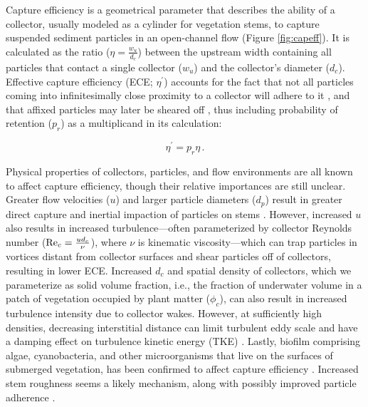 \documentclass[geosciences,article,submit,moreauthors,pdftex]{Definitions/mdpi}
\begin{document}
Capture efficiency is a geometrical parameter that describes the ability of a collector, usually modeled as a cylinder for vegetation stems, to capture suspended sediment particles in an open-channel flow (Figure \ref{fig:capeff}). It is calculated as the ratio ($\eta=\frac{w_u}{d_c}$) between the upstream width containing all particles that contact a single collector ($w_u$) and the collector's diameter ($d_c$). Effective capture efficiency (ECE; $\eta^\prime$) accounts for the fact that not all particles coming into infinitesimally close proximity to a collector will adhere to it \cite{spielman1977particle, wu2012single}, and that affixed particles may later be sheared off \cite{peruzzo2012capillary}, thus including probability of retention ($p_r$) as a multiplicand in its calculation:

\begin{equation}
    \eta^\prime=p_r \eta\,.
    \label{eq:ece}
\end{equation}

Physical properties of collectors, particles, and flow environments are all known to affect capture efficiency, though their relative importances are still unclear. Greater flow velocities ($u$) and larger particle diameters ($d_p$) result in greater direct capture and inertial impaction of particles on stems \cite{Palmer_2004,fuchs1965mechanics}. However, increased $u$ also results in increased turbulence---often parameterized by collector Reynolds number ($\mathrm{Re}_c=\frac{ud_c}{\nu}$), where $\nu$ is kinematic viscosity---which can trap particles in vortices distant from collector surfaces and shear particles off of collectors, resulting in lower ECE. Increased $d_c$ and spatial density of collectors, which we parameterize as solid volume fraction, i.e., the fraction of underwater volume in a patch of vegetation occupied by plant matter ($\phi_c$), can also result in increased turbulence intensity due to collector wakes. However, at sufficiently high densities, decreasing interstitial distance can limit turbulent eddy scale and have a damping effect on turbulence kinetic energy (TKE) \cite{nepf_drag_1999, leonard1995flow}. Lastly, biofilm comprising algae, cyanobacteria, and other microorganisms that live on the surfaces of submerged vegetation, has been confirmed to affect capture efficiency \cite{Fauria_2015}. Increased stem roughness \cite{Palmer_2004} seems a likely mechanism, along with possibly improved particle adherence \cite{wu2014colloid}.
\end{document}
